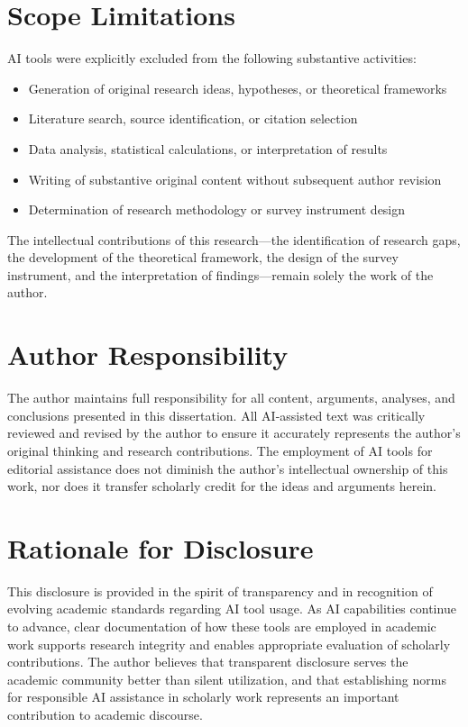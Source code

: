\begin{appendices}
\section{Scope Limitations}

AI tools were explicitly excluded from the following substantive activities:

\begin{itemize}
    \item Generation of original research ideas, hypotheses, or theoretical frameworks
    \item Literature search, source identification, or citation selection
    \item Data analysis, statistical calculations, or interpretation of results
    \item Writing of substantive original content without subsequent author revision
    \item Determination of research methodology or survey instrument design
\end{itemize}

The intellectual contributions of this research---the identification of research gaps, the development of the theoretical framework, the design of the survey instrument, and the interpretation of findings---remain solely the work of the author.

\section{Author Responsibility}

The author maintains full responsibility for all content, arguments, analyses, and conclusions presented in this dissertation. All AI-assisted text was critically reviewed and revised by the author to ensure it accurately represents the author's original thinking and research contributions. The employment of AI tools for editorial assistance does not diminish the author's intellectual ownership of this work, nor does it transfer scholarly credit for the ideas and arguments herein.

\section{Rationale for Disclosure}

This disclosure is provided in the spirit of transparency and in recognition of evolving academic standards regarding AI tool usage. As AI capabilities continue to advance, clear documentation of how these tools are employed in academic work supports research integrity and enables appropriate evaluation of scholarly contributions. The author believes that transparent disclosure serves the academic community better than silent utilization, and that establishing norms for responsible AI assistance in scholarly work represents an important contribution to academic discourse.

\end{appendices}